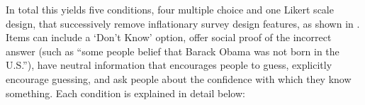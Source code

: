 \documentclass[12pt, letterpaper]{article}
\begin{document}



In total this yields five conditions, four multiple choice and one Likert scale design, that successively remove inflationary survey design features, as shown in . Items can include a `Don't Know' option, offer social proof of the incorrect answer (such as ``some people belief that Barack Obama was not born in the U.S.''), have neutral information that encourages people to guess, explicitly encourage guessing, and ask people about the confidence with which they know something. Each condition is explained in detail below:
\end{document}
